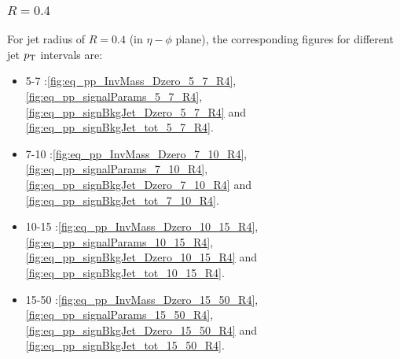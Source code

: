 \subsubsection{$R=0.4$}
For jet radius of $R=0.4$ (in $\eta-\phi$ plane), the corresponding figures for different jet $p_{\text T}$ intervals are:
\begin{itemize}
	\item 5-7   \GeVc:\ref{fig:eq_pp_InvMass_Dzero_5_7_R4}, \ref{fig:eq_pp_signalParams_5_7_R4}, \ref{fig:eq_pp_signBkgJet_Dzero_5_7_R4} and \ref{fig:eq_pp_signBkgJet_tot_5_7_R4}.
	\item 7-10  \GeVc:\ref{fig:eq_pp_InvMass_Dzero_7_10_R4}, \ref{fig:eq_pp_signalParams_7_10_R4}, \ref{fig:eq_pp_signBkgJet_Dzero_7_10_R4} and \ref{fig:eq_pp_signBkgJet_tot_7_10_R4}.
	\item 10-15 \GeVc:\ref{fig:eq_pp_InvMass_Dzero_10_15_R4}, \ref{fig:eq_pp_signalParams_10_15_R4}, \ref{fig:eq_pp_signBkgJet_Dzero_10_15_R4} and \ref{fig:eq_pp_signBkgJet_tot_10_15_R4}.
	\item 15-50 \GeVc:\ref{fig:eq_pp_InvMass_Dzero_15_50_R4}, \ref{fig:eq_pp_signalParams_15_50_R4}, \ref{fig:eq_pp_signBkgJet_Dzero_15_50_R4} and \ref{fig:eq_pp_signBkgJet_tot_15_50_R4}.
\end{itemize}


